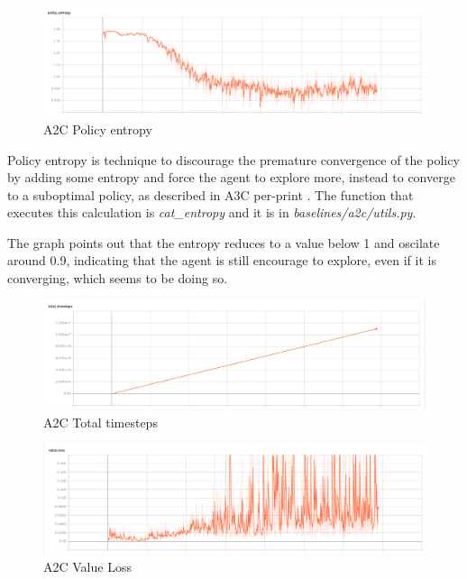 \documentclass[11pt,twoside,a4paper]{article}
\begin{document}
\begin{figure}[H]
  \includegraphics[scale=0.30]{images/graphs/a2c-policy-entropy-clean.png}
  \centering
  \caption{A2C Policy entropy}
  \label{fig:a2c-policy-entropy}
\end{figure}

Policy entropy is technique to discourage the premature convergence of the
policy by adding some entropy and force the agent to explore more, instead to
converge to a suboptimal policy, as described in A3C per-print
\cite{DBLP:journals/corr/MnihBMGLHSK16}. The function that executes this
calculation is \textit{cat\_entropy} and it is in
\textit{baselines/a2c/utils.py}.

The graph points out that the entropy reduces to a value below 1 and oscilate
around 0.9, indicating that the agent is still encourage to explore, even if it
is converging, which seems to be doing so.

\begin{figure}[H]
  \includegraphics[scale=0.30]{images/graphs/a2c-total-timesteps-clean.png}
  \centering
  \caption{A2C Total timesteps}
  \label{fig:a2c-total-timesteps}
\end{figure}

\begin{figure}[H]
  \includegraphics[scale=0.30]{images/graphs/a2c-value-loss-clean.png}
  \centering
  \caption{A2C Value Loss}
  \label{fig:a2c-value-loss-clean}
\end{figure}
\end{document}

